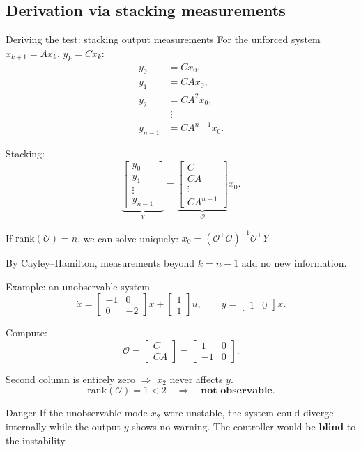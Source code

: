 \documentclass[aspectratio=169,10pt]{beamer}
\newcommand{\T}{^\top}
\newcommand{\Ocal}{\mathcal{O}}
\begin{document}
\subsection{Derivation via stacking measurements}

\begin{frame}{Deriving the test: stacking output measurements}
For the unforced system $x_{k+1}=Ax_k$, $y_k=Cx_k$:
\begin{align*}
y_0 &= Cx_0,\\
y_1 &= CAx_0,\\
y_2 &= CA^2x_0,\\
&\;\vdots\\
y_{n-1} &= CA^{n-1}x_0.
\end{align*}

Stacking:
\[
\underbrace{\begin{bmatrix}
y_0\\ y_1\\ \vdots\\ y_{n-1}
\end{bmatrix}}_{Y}
=
\underbrace{\begin{bmatrix}
C\\ CA\\ \vdots\\ CA^{n-1}
\end{bmatrix}}_{\Ocal}
x_0.
\]

If $\mathrm{rank}(\Ocal)=n$, we can solve uniquely:
$x_0 = (\Ocal\T\Ocal)^{-1}\Ocal\T Y$.

By Cayley--Hamilton, measurements beyond $k=n{-}1$ add no new information.
\end{frame}

\begin{frame}{Example: an unobservable system}
\[
\dot{x}=\begin{bmatrix}-1&0\\0&-2\end{bmatrix}x+\begin{bmatrix}1\\1\end{bmatrix}u,
\qquad
y=\begin{bmatrix}1&0\end{bmatrix}x.
\]

Compute:
\[
\Ocal=\begin{bmatrix}C\\CA\end{bmatrix}
=\begin{bmatrix}1&0\\-1&0\end{bmatrix}.
\]

Second column is entirely zero $\Rightarrow$ $x_2$ never affects $y$.
\[
\mathrm{rank}(\Ocal)=1<2 \quad\Rightarrow\quad \textbf{not observable}.
\]

\begin{alertbox}{Danger}
If the unobservable mode $x_2$ were unstable, the system could diverge
internally while the output $y$ shows no warning.  The controller would be
\textbf{blind} to the instability.
\end{alertbox}
\end{frame}
\end{document}
